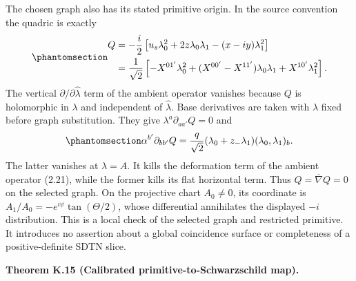 \documentclass[
  english,
  11pt,
  reqno]{amsart}
\makeatletter
\newcommand{\pandocstatementheading}[1]{%
  \par\addpenalty{\@beginparpenalty}%
  \addvspace{.5\baselineskip plus .2\baselineskip minus .2\baselineskip}%
  {\normalfont\bfseries #1\par}%
  \nobreak\@afterindenttrue\@afterheading
}
\makeatother
\begin{document}
The chosen graph also has its stated primitive origin. In the source
convention the quadric is exactly
\begin{equation}\protect\phantomsection\label{eq:sh-r1-explicit-quadric}{\begin{aligned}
Q&=-\frac i2\left[u_s\lambda_0^2+2z\lambda_0\lambda_1
                         -(x-iy)\lambda_1^2\right] \\
&=\frac1{\sqrt2}\left[-X^{01'}\lambda_0^2
 +(X^{00'}-X^{11'})\lambda_0\lambda_1+X^{10'}\lambda_1^2\right].
\end{aligned}}\end{equation} The vertical \(\partial/\partial\hat\lambda\) term of
the ambient operator vanishes because \(Q\) is holomorphic in
\(\lambda\) and independent of \(\hat\lambda\). Base derivatives are
taken with \(\lambda\) fixed before graph substitution. They give
\(\lambda^a\partial_{aa'}Q=0\) and
\begin{equation}\protect\phantomsection\label{eq:sh-r1-coincidence-check}{
 \alpha^{b'}\partial_{bb'}Q
   =\frac q{\sqrt2}(\lambda_0+z_-\lambda_1)(\lambda_0,\lambda_1)_b.
}\end{equation} The latter vanishes at \(\lambda=A\). It kills the
deformation term of the ambient operator (2.21), while the former kills
its flat horizontal term. Thus \(Q=\overline\nabla Q=0\) on the selected
graph. On the projective chart \(A_0\ne0\), its coordinate is
\(A_1/A_0=-e^{i\psi}\tan(\Theta/2)\), whose differential annihilates the
displayed \(-i\) distribution. This is a local check of the selected
graph and restricted primitive. It introduces no assertion about a
global coincidence surface or completeness of a positive-definite SDTN
slice.

\pandocstatementheading{\protect{}\label{thm:sh-r1-calibrated-horizon-map}Theorem K.15 (Calibrated primitive-to-Schwarzschild map).}
\end{document}
